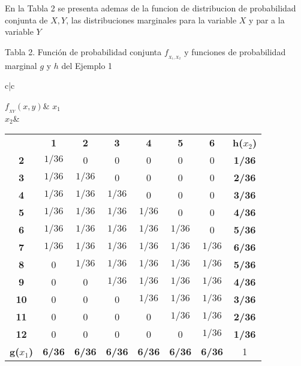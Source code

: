 \documentclass[base=hide,12pt]{elegantbook}
\begin{document}

En la Tabla 2 se presenta ademas de la funcion de distribucion de probabilidad conjunta de $X,Y$, las distribuciones marginales para la variable $X$ y par a la variable $Y$

	\begin{center}
	Tabla 2. Función de probabilidad conjunta $f_{_{X_1,X_2}}$ y funciones de probabilidad marginal $g$ y $h$ del Ejemplo 1  \\
		\begin{tabular}{c|c}
			
			$f_{_{XY}}(x,y)$& \textcolor{col5}{\bf $x_{1}$} \\	
			\hline 
			\textcolor{col4}{\bf $x_{2}$}&	
			\begin{tabular}{ccccccc|c}
				& \textcolor{col5}{\bf 1} & \textcolor{col5}{\bf 2} & \textcolor{col5}{\bf 3} & \textcolor{col5}{\bf 4} & \textcolor{col5}{\bf 5} & \textcolor{col5}{\bf 6} &  \textcolor{col4}{\bf  h($x_{2}$)} \\	
				\textcolor{col4}{\bf 2} &    $1/36$&  0&  0&  0&  0& 0 &  \textcolor{col4}{\bf 1/36} \\
				\textcolor{col4}{\bf 3} &     $1/36$&  $1/36$&  0&  0&  0& 0& \textcolor{col4}{\bf 2/36} \\
				\textcolor{col4}{\bf 4} &     $1/36$&  $1/36$ &  $1/36$&  0&  0& 0& \textcolor{col4}{\bf 3/36} \\
				\textcolor{col4}{\bf 5} &     $1/36$&   $1/36$&   $1/36$&   $1/36$&  0& 0& \textcolor{col4}{\bf 4/36} \\
				\textcolor{col4}{\bf 6} &     $1/36$&   $1/36$&   $1/36$&   $1/36$&   $1/36$& 0& \textcolor{col4}{\bf 5/36} \\
				\textcolor{col4}{\bf 7} &     $1/36$&   $1/36$&   $1/36$&   $1/36$&  $1/36$& $1/36$& \textcolor{col4}{\bf 6/36} \\
				\textcolor{col4}{\bf 8} &    0&   $1/36$&   $1/36$&  $1/36$&   $1/36$&  $1/36$& \textcolor{col4}{\bf 5/36} \\
				\textcolor{col4}{\bf 9} &    0&  0&  $1/36$&  $1/36$&   $1/36$&  $1/36$ &\textcolor{col4}{\bf 4/36} \\
				\textcolor{col4}{\bf 10}&    0&  0&  0& $1/36$&   $1/36$&  $1/36$ &\textcolor{col4}{\bf 3/36} \\
				\textcolor{col4}{\bf 11}&    0&  0&  0&  0&  $1/36$&  $1/36$ &\textcolor{col4}{\bf 2/36} \\
				\textcolor{col4}{\bf 12}&    0&  0&  0&  0&  0&  $1/36$ &\textcolor{col4}{\bf 1/36} \\
				\hline
				\textcolor{col5}{\bf  g($x_{1}$)}&\textcolor{col5}{\bf  6/36}& \textcolor{col5}{\bf  6/36} & \textcolor{col5}{\bf  6/36} & \textcolor{col5}{\bf  6/36} & \textcolor{col5}{\bf  6/36} & \textcolor{col5}{\bf  6/36}  & 1\\
			\end{tabular}	
			\\
		\end{tabular}	
	\end{center}
	
\end{document}

